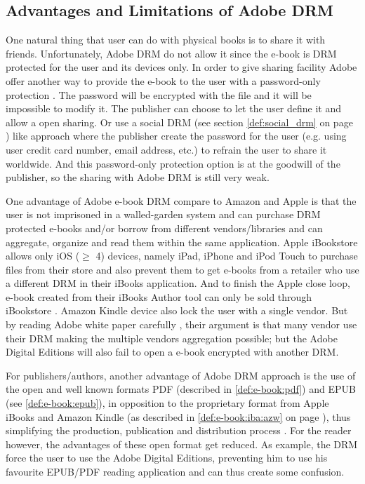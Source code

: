 \documentclass[11pt,a4paper,oneside]{memoir}
\begin{document}
\subsection{Advantages and Limitations of Adobe DRM}

One natural thing that user can do with physical books is to share it with friends. 
Unfortunately, Adobe DRM do not allow it since the e-book is DRM protected for the user and its devices only. 
In order to give sharing facility Adobe offer another way to provide the e-book to the user with a password-only protection \cite[Ability to share section]{adobe:whitepaper}. 
The password will be encrypted with the file and it will be impossible to modify it. 
The publisher can choose to let the user define it and allow a open sharing.
Or use a social DRM (see section \ref{def:social_drm} on page \pageref{def:social_drm}) like approach where the publisher create the password for the user (e.g. using user credit card number, email address, etc.) to refrain the user to share it worldwide. 
And this password-only protection option is at the goodwill of the publisher, so the sharing with Adobe DRM is still very weak.

One advantage of Adobe e-book DRM compare to Amazon and Apple is that the user is not imprisoned in a walled-garden system and can purchase DRM protected e-books and/or borrow from different vendors/libraries and can aggregate, organize and read them within the same application. Apple iBookstore allows only iOS ($\geqslant$ 4) devices, namely iPad, iPhone and iPod Touch to purchase files from their store and also prevent them to get e-books from a retailer who use a different DRM in their iBooks application. And to finish the Apple close loop, e-book created from their iBooks Author tool can only be sold through iBookstore \cite{zdnet:apple_ibooks_license}. Amazon Kindle device also lock the user with a single vendor. But by reading Adobe white paper carefully \cite[Open environment section]{adobe:whitepaper}, their argument is that many vendor use their DRM making the multiple vendors aggregation possible; but the Adobe Digital Editions will also fail to open a e-book encrypted with another DRM.

For publishers/authors, another advantage of Adobe DRM approach is the use of the open and well known formats PDF (described in \vref{def:e-book:pdf}) and EPUB (see \vref{def:e-book:epub}), in opposition to the proprietary format from Apple iBooks and Amazon Kindle (as described in \ref{def:e-book:iba:azw} on page \pageref{def:e-book:iba:azw}), thus simplifying the production, publication and distribution process \cite[How the Adobe eBook Platform helps publishers section]{adobe:whitepaper}. For the reader however, the advantages of these open format get reduced. As example, the DRM force the user to use the Adobe Digital Editions, preventing him to use his favourite EPUB/PDF reading application and can thus create some confusion.
\end{document}
